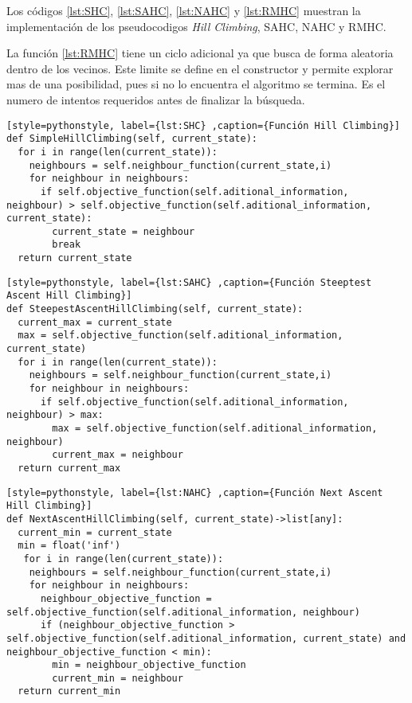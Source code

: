 \documentclass[12pt,twoside]{article}
\begin{document}
Los códigos \ref{lst:SHC}, \ref{lst:SAHC}, \ref{lst:NAHC} y \ref{lst:RMHC} muestran la implementación de los pseudocodigos \textit{Hill Climbing}, SAHC, NAHC y RMHC.

La función \ref{lst:RMHC} tiene un ciclo adicional ya que busca de forma aleatoria dentro de los vecinos. Este limite se define en el constructor y permite explorar mas de una posibilidad, pues si no lo encuentra el algoritmo se termina. Es el numero de intentos requeridos antes de finalizar la búsqueda.

\begin{lstlisting}[style=pythonstyle, label={lst:SHC} ,caption={Función Hill Climbing}]
def SimpleHillClimbing(self, current_state):
  for i in range(len(current_state)):
    neighbours = self.neighbour_function(current_state,i)
    for neighbour in neighbours:
      if self.objective_function(self.aditional_information, neighbour) > self.objective_function(self.aditional_information, current_state):
      	current_state = neighbour
        break    
  return current_state
\end{lstlisting}

\begin{lstlisting}[style=pythonstyle, label={lst:SAHC} ,caption={Función Steeptest Ascent Hill Climbing}]
def SteepestAscentHillClimbing(self, current_state):
  current_max = current_state
  max = self.objective_function(self.aditional_information, current_state)
  for i in range(len(current_state)):
    neighbours = self.neighbour_function(current_state,i)
    for neighbour in neighbours:
      if self.objective_function(self.aditional_information, neighbour) > max:
        max = self.objective_function(self.aditional_information, neighbour)
        current_max = neighbour
  return current_max
\end{lstlisting}

\begin{lstlisting}[style=pythonstyle, label={lst:NAHC} ,caption={Función Next Ascent Hill Climbing}]
def NextAscentHillClimbing(self, current_state)->list[any]:
  current_min = current_state
  min = float('inf')
   for i in range(len(current_state)):
    neighbours = self.neighbour_function(current_state,i)
    for neighbour in neighbours:
      neighbour_objective_function = self.objective_function(self.aditional_information, neighbour)
      if (neighbour_objective_function > self.objective_function(self.aditional_information, current_state) and neighbour_objective_function < min):
        min = neighbour_objective_function
        current_min = neighbour
  return current_min
\end{lstlisting}
\end{document}

